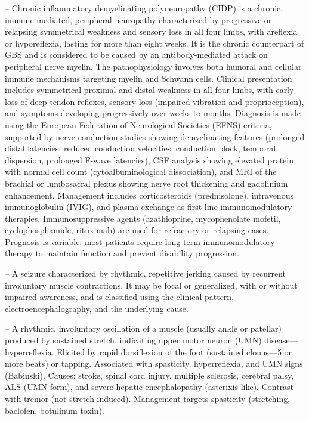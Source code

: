 -- Chronic inflammatory demyelinating polyneuropathy (CIDP) is a chronic, immune-mediated, peripheral neuropathy characterized by progressive or relapsing symmetrical weakness and sensory loss in all four limbs, with areflexia or hyporeflexia, lasting for more than eight weeks. It is the chronic counterpart of GBS and is considered to be caused by an antibody-mediated attack on peripheral nerve myelin. The pathophysiology involves both humoral and cellular immune mechanisms targeting myelin and Schwann cells. Clinical presentation includes symmetrical proximal and distal weakness in all four limbs, with early loss of deep tendon reflexes, sensory loss (impaired vibration and proprioception), and symptoms developing progressively over weeks to months. Diagnosis is made using the European Federation of Neurological Societies (EFNS) criteria, supported by nerve conduction studies showing demyelinating features (prolonged distal latencies, reduced conduction velocities, conduction block, temporal dispersion, prolonged F-wave latencies), CSF analysis showing elevated protein with normal cell count (cytoalbuminological dissociation), and MRI of the brachial or lumbosacral plexus showing nerve root thickening and gadolinium enhancement. Management includes corticosteroids (prednisolone), intravenous immunoglobulin (IVIG), and plasma exchange as first-line immunomodulatory therapies. Immunosuppressive agents (azathioprine, mycophenolate mofetil, cyclophosphamide, rituximab) are used for refractory or relapsing cases. Prognosis is variable; most patients require long-term immunomodulatory therapy to maintain function and prevent disability progression.

-- A seizure characterized by rhythmic, repetitive jerking caused by recurrent involuntary muscle contractions. It may be focal or generalized, with or without impaired awareness, and is classified using the clinical pattern, electroencephalography, and the underlying cause.

-- A rhythmic, involuntary oscillation of a muscle (usually ankle or patellar) produced by sustained stretch, indicating upper motor neuron (UMN) disease—hyperreflexia. Elicited by rapid dorsiflexion of the foot (sustained clonus—5 or more beats) or tapping. Associated with spasticity, hyperreflexia, and UMN signs (Babinski). Causes: stroke, spinal cord injury, multiple sclerosis, cerebral palsy, ALS (UMN form), and severe hepatic encephalopathy (asterixis-like). Contrast with tremor (not stretch-induced). Management targets spasticity (stretching, baclofen, botulinum toxin).

